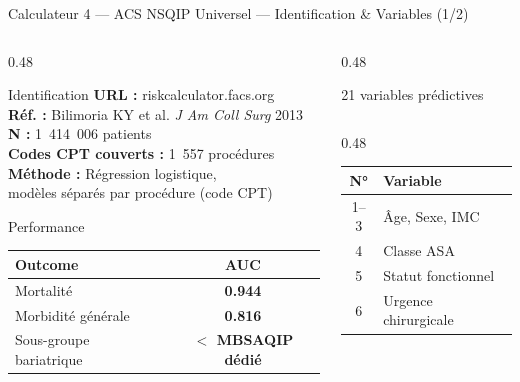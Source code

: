 \documentclass[aspectratio=169]{beamer}
\begin{document}
\begin{frame}{Calculateur 4 --- ACS NSQIP Universel --- Identification \& Variables (1/2)}
  \begin{columns}[T]
    \begin{column}{0.48\textwidth}
      \begin{block}{Identification}
        \footnotesize
        \textbf{URL :} riskcalculator.facs.org\\
        \textbf{Réf. :} Bilimoria KY et al. \textit{J Am Coll Surg} 2013\\[4pt]
        \textbf{N :} 1~414~006 patients\\
        \textbf{Codes CPT couverts :} 1~557 procédures\\[4pt]
        \textbf{Méthode :} Régression logistique,\\
        modèles séparés par procédure (code CPT)
      \end{block}
      \vspace{0.4em}
      \begin{exampleblock}{Performance}
        \footnotesize
        \begin{tabular}{lc}
          \toprule
          \textbf{Outcome} & \textbf{AUC} \\
          \midrule
          Mortalité        & \textbf{0.944} \\
          Morbidité générale & \textbf{0.816} \\
          Sous-groupe bariatrique & \textbf{$<$ MBSAQIP dédié} \\
          \bottomrule
        \end{tabular}
      \end{exampleblock}
    \end{column}
    \begin{column}{0.48\textwidth}
      \begin{block}{21 variables prédictives}
  \footnotesize
  \begin{columns}[T]
    \begin{column}{0.48\textwidth}
      \begin{tabular}{cl}
        \toprule
        \textbf{N°} & \textbf{Variable} \\
        \midrule
        1--3 & Âge, Sexe, IMC \\
        4    & Classe ASA \\
        5    & Statut fonctionnel \\
        6    & Urgence chirurgicale \\

\end{tabular}
\end{column}
\end{columns}
\end{block}
\end{column}
\end{columns}
\end{frame}
\end{document}
